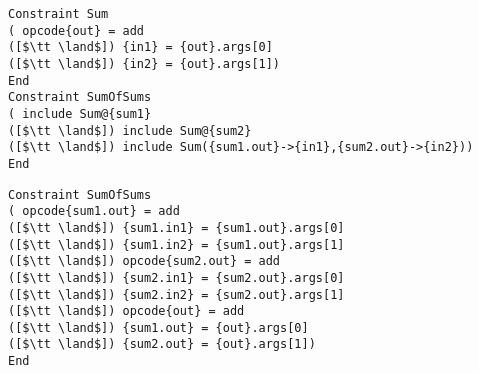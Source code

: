 \begin{lstlisting}[language=CAnDL,basicstyle=\linespread{0.984}\ttfamily]
Constraint Sum
( opcode{out} = add
([$\tt \land$]) {in1} = {out}.args[0]
([$\tt \land$]) {in2} = {out}.args[1])
End
Constraint SumOfSums
( include Sum@{sum1}
([$\tt \land$]) include Sum@{sum2}
([$\tt \land$]) include Sum({sum1.out}->{in1},{sum2.out}->{in2}))
End
\end{lstlisting}
\begin{lstlisting}[language=CAnDL,basicstyle=\linespread{0.984}\ttfamily]
Constraint SumOfSums
( opcode{sum1.out} = add
([$\tt \land$]) {sum1.in1} = {sum1.out}.args[0]
([$\tt \land$]) {sum1.in2} = {sum1.out}.args[1]
([$\tt \land$]) opcode{sum2.out} = add
([$\tt \land$]) {sum2.in1} = {sum2.out}.args[0]
([$\tt \land$]) {sum2.in2} = {sum2.out}.args[1]
([$\tt \land$]) opcode{out} = add
([$\tt \land$]) {sum1.out} = {out}.args[0]
([$\tt \land$]) {sum2.out} = {out}.args[1])
End
\end{lstlisting}